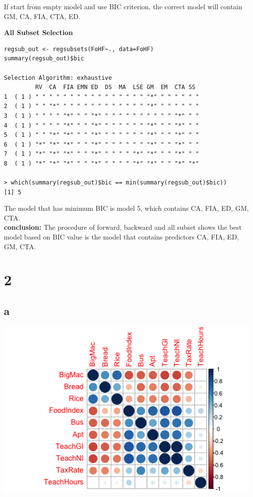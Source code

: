 \documentclass[11pt,letterpaper]{article}
\begin{document}
\noindent If start from empty model and use BIC criterion, the correct model will contain GM, CA, FIA, CTA, ED. 

\noindent \textbf{All Subset Selection}
\begin{verbatim}
regsub_out <- regsubsets(FoHF~., data=FoHF)
summary(regsub_out)$bic

Selection Algorithm: exhaustive
         RV  CA  FIA EMN ED  DS  MA  LSE GM  EM  CTA SS 
1  ( 1 ) " " " " " " " " " " " " " " " " "*" " " " " " "
2  ( 1 ) " " "*" " " " " " " " " " " " " "*" " " " " " "
3  ( 1 ) " " " " "*" " " "*" " " " " " " " " " " "*" " "
4  ( 1 ) " " " " "*" " " "*" " " " " " " "*" " " "*" " "
5  ( 1 ) " " "*" "*" " " "*" " " " " " " "*" " " "*" " "
6  ( 1 ) "*" "*" "*" " " "*" " " " " " " "*" " " "*" " "
7  ( 1 ) "*" "*" "*" " " "*" " " " " "*" "*" " " "*" " "
8  ( 1 ) "*" "*" "*" " " "*" " " " " "*" "*" " " "*" "*"

> which(summary(regsub_out)$bic == min(summary(regsub_out)$bic))
[1] 5
\end{verbatim}

\noindent The model that has minimum BIC is model 5, which contains CA, FIA, ED, GM, CTA. \\

\noindent \textbf{conclusion:} The procedure of forward, backward and all subset shows the best model based on BIC value is the model that contains  predictors CA, FIA, ED, GM, CTA. 

\section*{2}
\subsection*{a}

\includegraphics[scale=0.8]{2-a-1.png}
\end{document}
